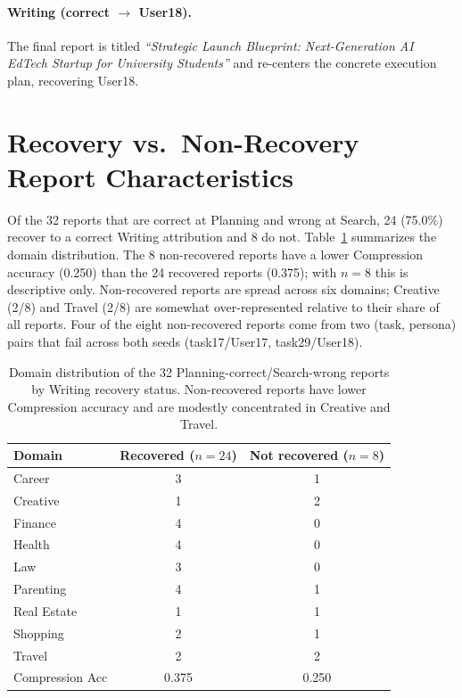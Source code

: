 \documentclass[]{article}
\begin{document}
\paragraph{Writing (correct $\to$ User18).}
The final report is titled \emph{``Strategic Launch Blueprint: Next-Generation
AI EdTech Startup for University Students''} and re-centers the concrete
execution plan, recovering User18.

\section{Recovery vs.\ Non-Recovery Report Characteristics}
\label{app:recovery}

Of the 32 reports that are correct at Planning and wrong at Search,
24 (75.0\%) recover to a correct Writing attribution and 8 do not.
Table~\ref{tab:recovery_char} summarizes the domain distribution.
The 8 non-recovered reports have a lower Compression accuracy (0.250)
than the 24 recovered reports (0.375); with $n{=}8$ this is descriptive only.
Non-recovered reports are spread across six domains; Creative (2/8) and Travel
(2/8) are somewhat over-represented relative to their share of all reports.
Four of the eight non-recovered reports come from two (task, persona) pairs
that fail across both seeds (task17/User17, task29/User18).

\begin{table}[!ht]
\centering
\small
\begin{tabular}{lcc}
\toprule
\textbf{Domain} & \textbf{Recovered ($n=24$)} & \textbf{Not recovered ($n=8$)} \\
\midrule
Career      & 3 & 1 \\
Creative    & 1 & 2 \\
Finance     & 4 & 0 \\
Health      & 4 & 0 \\
Law         & 3 & 0 \\
Parenting   & 4 & 1 \\
Real Estate & 1 & 1 \\
Shopping    & 2 & 1 \\
Travel      & 2 & 2 \\
\midrule
Compression Acc & 0.375 & 0.250 \\
\bottomrule
\end{tabular}
\caption{Domain distribution of the 32 Planning-correct/Search-wrong reports
  by Writing recovery status. Non-recovered reports have lower Compression
  accuracy and are modestly concentrated in Creative and Travel.}
\label{tab:recovery_char}
\end{table}
\end{document}
